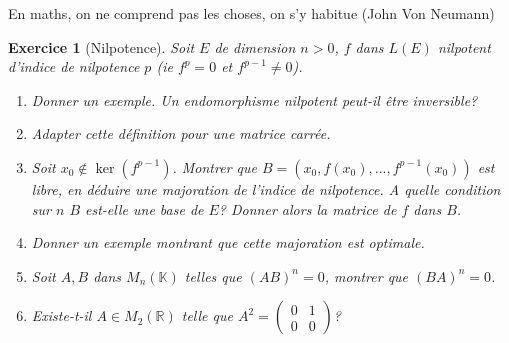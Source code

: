 \documentclass[12pt,a4paper]{article}
\newcommand{\R}{\mathbb{R}}
\newcommand{\N}{\mathbb{N}}
\newcommand{\K}{\mathbb{K} }
\theoremstyle{break}
\theoremstyle{break}
\newtheorem{Exo}{Exercice}
\begin{document}
%
\og En maths, on ne comprend pas les choses, on s'y habitue \fg (John Von Neumann)

\begin{Exo}[Nilpotence]
	Soit $E$ de dimension $n>0$, $f$ dans $L(E)$ nilpotent d'indice de nilpotence $p$ (ie $f^p=0$ et $f^{p-1}\neq 0$).
	
	\begin{enumerate}
		\item Donner un exemple. Un endomorphisme nilpotent peut-il être inversible?
		\item Adapter cette définition pour une matrice carrée.
		\item
		Soit $x_0\notin\ker(f^{p-1})$. Montrer que $B=\left(x_0,f(x_0),...,f^{p-1}(x_0)\right)$ est libre, en déduire une majoration de l'indice de nilpotence. A quelle condition sur $n$ $B$ est-elle une base de $E$? Donner alors la matrice de $f$ dans $B$.
		\item
		Donner un exemple montrant que cette majoration est optimale.
		\item Soit $A,B$ dans $M_n(\K)$ telles que $(AB)^n=0$, montrer que $(BA)^n=0$.
		\item Existe-t-il $A\in M_2(\R)$ telle que $A^2=\begin{pmatrix}
			0 & 1 \\
			0 & 0
		\end{pmatrix}$?
		
	\end{enumerate}
\end{Exo}
%
\end{document}
